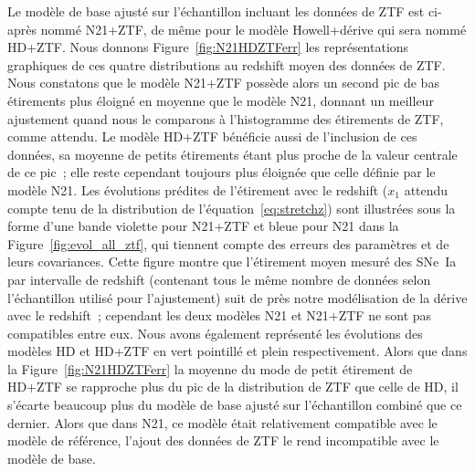 \documentclass[../main/main.tex]{subfiles}
\begin{document}
Le modèle de base ajusté sur l'échantillon incluant les données de ZTF est
ci-après nommé N21+ZTF, de même pour le modèle Howell+dérive qui sera nommé
HD+ZTF. Nous donnons Figure~\ref{fig:N21HDZTFerr} les représentations graphiques
de ces quatre distributions au redshift moyen des données de ZTF. Nous
constatons que le modèle N21+ZTF possède alors un second pic de bas étirements
plus éloigné en moyenne que le modèle N21, donnant un meilleur ajustement quand
nous le comparons à l'histogramme des étirements de ZTF, comme attendu. Le modèle
HD+ZTF bénéficie aussi de l'inclusion de ces données, sa moyenne de petits
étirements étant plus proche de la valeur centrale de ce pic~; elle reste
cependant toujours plus éloignée que celle définie par le modèle N21. Les
évolutions prédites de l'étirement avec le redshift ($x_1$ attendu compte tenu
de la distribution de l'équation~\ref{eq:stretchz}) sont illustrées sous la
forme d'une bande violette pour N21+ZTF et bleue pour N21 dans la
Figure~\ref{fig:evol_all_ztf}, qui tiennent compte des erreurs des paramètres et
de leurs covariances. Cette figure montre que l'étirement moyen mesuré des
SNe~Ia par intervalle de redshift (contenant tous le même nombre de données
selon l'échantillon utilisé pour l'ajustement) suit de près notre modélisation
de la dérive avec le redshift~; cependant les deux modèles N21 et N21+ZTF ne
sont pas compatibles entre eux. Nous avons également représenté les évolutions
des modèles HD et HD+ZTF en vert pointillé et plein respectivement. Alors que
dans la Figure~\ref{fig:N21HDZTFerr} la moyenne du mode de petit étirement de
HD+ZTF se rapproche plus du pic de la distribution de ZTF que celle de HD, il
s'écarte beaucoup plus du modèle de base ajusté sur l'échantillon combiné que ce
dernier. Alors que dans N21, ce modèle était relativement compatible avec le
modèle de référence, l'ajout des données de ZTF le rend incompatible avec le
modèle de base. 
\end{document}
